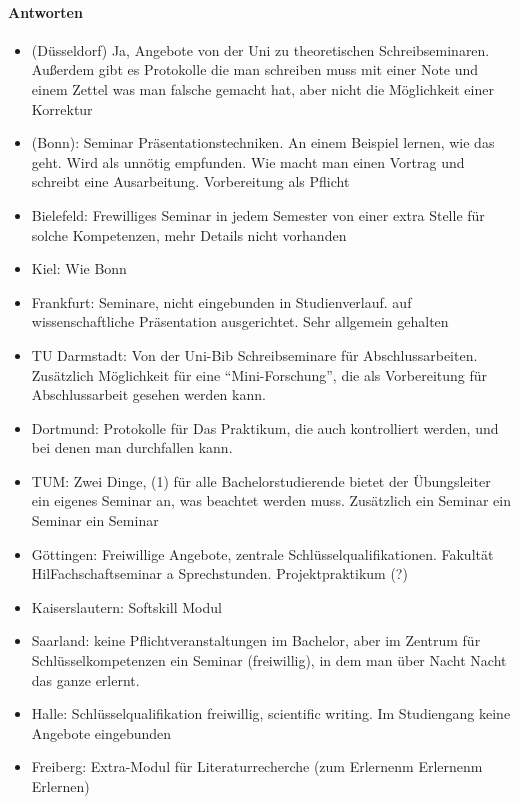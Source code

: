       \paragraph{Antworten}
        \begin{itemize}
          \item (Düsseldorf) Ja, Angebote von der Uni zu theoretischen Schreibseminaren. Außerdem gibt es Protokolle die man schreiben muss mit einer Note und einem Zettel was man falsche gemacht hat, aber nicht die Möglichkeit einer Korrektur
          \item (Bonn): Seminar Präsentationstechniken. An einem Beispiel lernen, wie das geht. Wird als unnötig empfunden. Wie macht man einen Vortrag und schreibt eine Ausarbeitung. Vorbereitung als Pflicht
          \item Bielefeld: Frewilliges Seminar in jedem Semester von einer extra Stelle für solche Kompetenzen, mehr Details nicht vorhanden
          \item Kiel: Wie Bonn
          \item Frankfurt: Seminare, nicht eingebunden in Studienverlauf. auf wissenschaftliche Präsentation ausgerichtet. Sehr allgemein gehalten
          \item TU Darmstadt: Von der Uni-Bib Schreibseminare für Abschlussarbeiten. Zusätzlich Möglichkeit für eine “Mini-Forschung”, die als Vorbereitung für Abschlussarbeit gesehen werden kann.
          \item Dortmund: Protokolle für Das Praktikum, die auch kontrolliert werden, und bei denen man durchfallen kann.
          \item TUM: Zwei Dinge, (1) für alle Bachelorstudierende bietet der Übungsleiter ein eigenes Seminar an, was beachtet werden muss. Zusätzlich ein Seminar ein Seminar ein Seminar
          \item Göttingen: Freiwillige Angebote, zentrale Schlüsselqualifikationen. Fakultät HilFachschaftseminar a Sprechstunden. Projektpraktikum (?)
          \item Kaiserslautern: Softskill Modul
          \item Saarland: keine Pflichtveranstaltungen im Bachelor, aber im Zentrum für Schlüsselkompetenzen ein Seminar (freiwillig), in dem man über Nacht Nacht das ganze erlernt.
          \item Halle: Schlüsselqualifikation freiwillig, scientific writing. Im Studiengang keine Angebote eingebunden
          \item Freiberg: Extra-Modul für Literaturrecherche (zum Erlernenm Erlernenm Erlernen)

\end{itemize}
